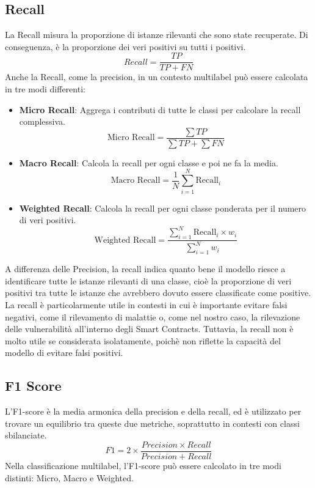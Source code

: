 \documentclass[../../Thesis.tex]{subfiles}
\begin{document}
\subsection{Recall}
La Recall misura la proporzione di istanze rilevanti che sono state recuperate. Di conseguenza, è la proporzione dei veri positivi su tutti i positivi.
$$Recall = \frac{ TP}{TP + FN} $$
Anche la Recall, come la precision, in un contesto multilabel può essere calcolata in tre modi differenti:
\begin{itemize}
    \item \textbf{Micro Recall}: Aggrega i contributi di tutte le classi per calcolare la recall complessiva.
    $$ \text{Micro Recall} = \frac{\sum TP}{\sum TP + \sum FN} $$
    \item \textbf{Macro Recall}: Calcola la recall per ogni classe e poi ne fa la media.
    $$ \text{Macro Recall} = \frac{1}{N} \sum_{i=1}^{N} \text{Recall}_i $$
    \item \textbf{Weighted Recall}: Calcola la recall per ogni classe ponderata per il numero di veri positivi.
    $$ \text{Weighted Recall} = \frac{\sum_{i=1}^{N} \text{Recall}_i \times w_i}{\sum_{i=1}^{N} w_i} $$
\end{itemize}
A differenza delle Precision, la recall indica quanto bene il modello riesce a identificare tutte le istanze rilevanti di una classe, cioè la proporzione di veri positivi tra tutte le istanze che avrebbero dovuto essere classificate come positive. La recall è particolarmente utile in contesti in cui è importante evitare falsi negativi, come il rilevamento di malattie o, come nel nostro caso, la rilevazione delle vulnerabilità all'interno degli Smart Contracts. Tuttavia, la recall non è molto utile se considerata isolatamente, poichè non riflette la capacità del modello di evitare falsi positivi.

\subsection{F1 Score}
L'F1-score è la media armonica della precision e della recall, ed è utilizzato per trovare un equilibrio tra queste due metriche, soprattutto in contesti con classi sbilanciate. 
$$ F1 = 2 \times \frac{Precision \times Recall}{Precision + Recall} $$
Nella classificazione multilabel, l'F1-score può essere calcolato in tre modi distinti: Micro, Macro e Weighted. 
\end{document}
